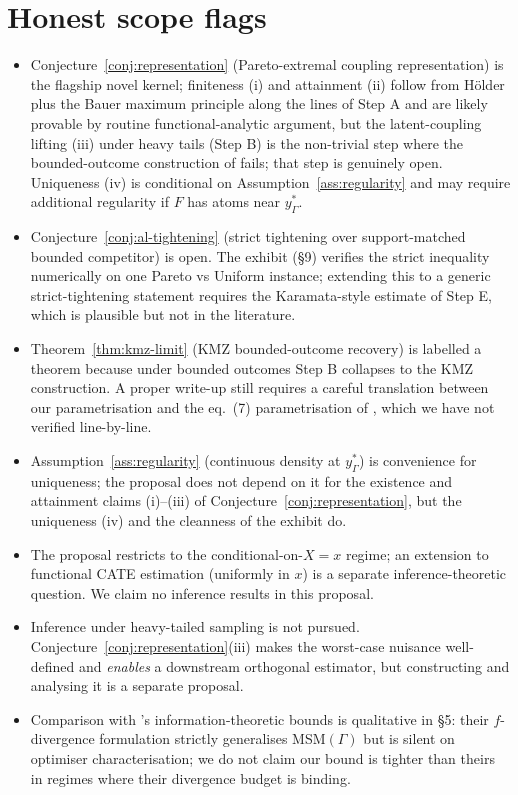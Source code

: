 \documentclass[11pt]{article}
\theoremstyle{definition}
\theoremstyle{plain}
\theoremstyle{remark}
\begin{document}
\section{Honest scope flags}

\begin{itemize}[leftmargin=*]
  \item Conjecture~\ref{conj:representation} (Pareto-extremal coupling representation) is the flagship novel kernel; finiteness (i) and attainment (ii) follow from H\"older plus the Bauer maximum principle along the lines of Step A and are likely provable by routine functional-analytic argument, but the latent-coupling lifting (iii) under heavy tails (Step B) is the non-trivial step where the bounded-outcome construction of \citet{KallusMaoZhou2019} fails; that step is genuinely open. Uniqueness (iv) is conditional on Assumption~\ref{ass:regularity} and may require additional regularity if $F$ has atoms near $y_\Gamma^*$.
  \item Conjecture~\ref{conj:al-tightening} (strict tightening over support-matched bounded competitor) is open. The exhibit (\S9) verifies the strict inequality numerically on one Pareto vs Uniform instance; extending this to a generic strict-tightening statement requires the Karamata-style estimate of Step E, which is plausible but not in the literature.
  \item Theorem~\ref{thm:kmz-limit} (KMZ bounded-outcome recovery) is labelled a theorem because under bounded outcomes Step B collapses to the KMZ construction. A proper write-up still requires a careful translation between our parametrisation and the eq.~(7) parametrisation of \citet{KallusMaoZhou2019}, which we have not verified line-by-line.
  \item Assumption~\ref{ass:regularity} (continuous density at $y_\Gamma^*$) is convenience for uniqueness; the proposal does not depend on it for the existence and attainment claims (i)--(iii) of Conjecture~\ref{conj:representation}, but the uniqueness (iv) and the cleanness of the exhibit do.
  \item The proposal restricts to the conditional-on-$X = x$ regime; an extension to functional CATE estimation (uniformly in $x$) is a separate inference-theoretic question. We claim no inference results in this proposal.
  \item Inference under heavy-tailed sampling \citep{TudballBowdenHughesTilling2023SampleConstrained,DornGuoKallus2025} is not pursued. Conjecture~\ref{conj:representation}(iii) makes the worst-case nuisance well-defined and \emph{enables} a downstream orthogonal estimator, but constructing and analysing it is a separate proposal.
  \item Comparison with \citet{JungKang2026}'s information-theoretic bounds is qualitative in \S5: their $f$-divergence formulation strictly generalises MSM$(\Gamma)$ but is silent on optimiser characterisation; we do not claim our bound is tighter than theirs in regimes where their divergence budget is binding.
\end{itemize}
\end{document}
